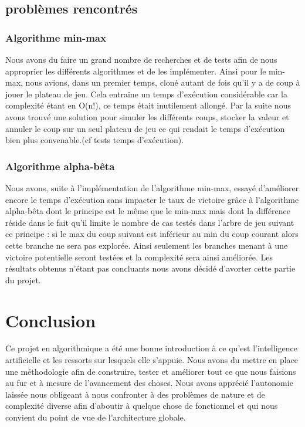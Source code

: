 \documentclass{report}
\begin{document}
\section{problèmes rencontrés}
\subsection{Algorithme min-max}
 Nous avons du faire un grand nombre de recherches et de tests afin de nous approprier les différents algorithmes et de les implémenter.
Ainsi pour le min-max, nous avions, dans un premier temps, cloné autant de fois qu'il y a de coup à jouer le plateau de jeu. Cela entraine un temps d'exécution considérable car la complexité étant en O(n!), ce temps était inutilement allongé. Par la suite nous avons trouvé une solution pour simuler les différents coups, stocker la valeur et annuler le coup sur un seul plateau de jeu ce qui rendait le temps d'exécution bien plus convenable.(cf tests temps d'exécution).
\subsection{Algorithme alpha-bêta} \label{alphabeta}
Nous avons, suite à l'implémentation de l'algorithme min-max, essayé d'améliorer encore le temps d'exécution sans impacter le taux de victoire grâce à l'algorithme alpha-bêta dont le principe est le même que le min-max mais dont la différence réside dans le fait qu'il limite le nombre de cas testés dans l'arbre de jeu suivant ce principe : si le max du coup suivant est inférieur au min du coup courant alors cette branche ne sera pas explorée. Ainsi seulement les branches menant à une victoire potentielle seront testées et la complexité sera ainsi améliorée.
Les résultats obtenus n'étant pas concluants nous avons décidé d'avorter cette partie du projet. 


\chapter*{Conclusion}
Ce projet en algorithmique a été une bonne introduction à ce qu'est l'intelligence artificielle et les ressorts sur lesquels elle s'appuie.
Nous avons du mettre en place une méthodologie afin de construire, tester et améliorer tout ce que nous faisions au fur et à mesure de l'avancement des choses.
Nous avons apprécié l'autonomie laissée nous obligeant à nous confronter à des problèmes de nature et de complexité diverse afin d'aboutir à quelque chose de fonctionnel
et qui nous convient du point de vue de l'architecture globale.
\end{document}
